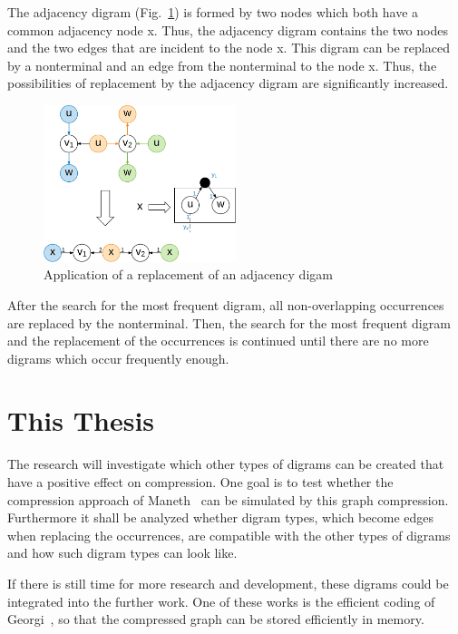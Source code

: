\documentclass[a4paper]{scrartcl}
\begin{document}
The adjacency digram (Fig.~\ref{fig:adjazenzDigram}) is formed by two nodes which both have a common adjacency node x. Thus, the adjacency digram contains the two nodes and the two edges that are incident to the node x. This digram can be replaced by a nonterminal and an edge from the nonterminal to the node x.
Thus, the possibilities of replacement by the adjacency digram are significantly increased.


\begin{figure}[h]
	\centering
	\includegraphics[width=0.5\textwidth]{img/adjazenzDigram}
	\caption{Application of a replacement of an adjacency digam}
	\label{fig:adjazenzDigram}
\end{figure}

After the search for the most frequent digram, all non-overlapping occurrences are replaced by the nonterminal. Then, the search for the most frequent digram and the replacement of the occurrences is continued until there are no more digrams which occur frequently enough.



\section{This Thesis}

The research will investigate which other types of digrams can be created that have a positive effect on compression. One goal is to test whether the compression approach of Maneth~\cite{maneth} can be simulated by this graph compression. Furthermore it shall be analyzed whether digram types, which become edges when replacing the occurrences, are compatible with the other types of digrams and how such digram types can look like.


If there is still time for more research and development, these digrams could be integrated into the further work. One of these works is the efficient coding of Georgi~\cite{georgi}, so that the compressed graph can be stored efficiently in memory.
\end{document}
